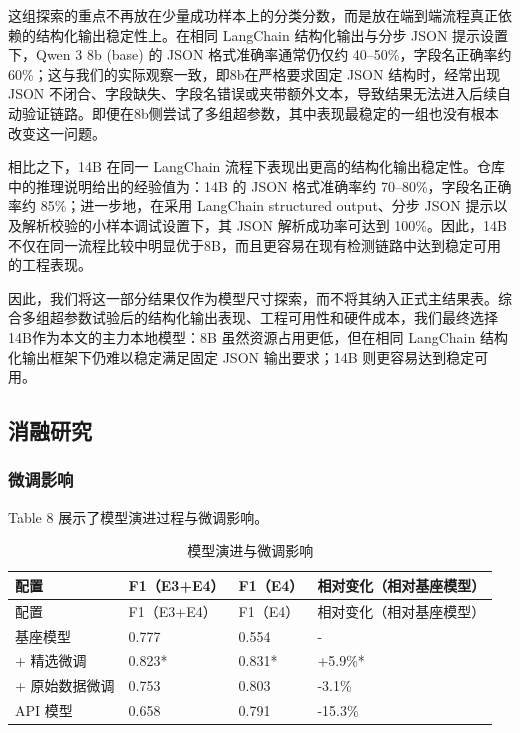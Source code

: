 \documentclass[11pt]{article}
\begin{document}
这组探索的重点不再放在少量成功样本上的分类分数，而是放在端到端流程真正依赖的结构化输出稳定性上。在相同 LangChain 结构化输出与分步 JSON 提示设置下，Qwen 3 8b (base) 的 JSON 格式准确率通常仍仅约 40--50\%，字段名正确率约 60\%；这与我们的实际观察一致，即8b在严格要求固定 JSON 结构时，经常出现 JSON 不闭合、字段缺失、字段名错误或夹带额外文本，导致结果无法进入后续自动验证链路。即便在8b侧尝试了多组超参数，其中表现最稳定的一组也没有根本改变这一问题。

相比之下，14B 在同一 LangChain 流程下表现出更高的结构化输出稳定性。仓库中的推理说明给出的经验值为：14B 的 JSON 格式准确率约 70--80\%，字段名正确率约 85\%；进一步地，在采用 LangChain structured output、分步 JSON 提示以及解析校验的小样本调试设置下，其 JSON 解析成功率可达到 100\%。因此，14B 不仅在同一流程比较中明显优于8B，而且更容易在现有检测链路中达到稳定可用的工程表现。

因此，我们将这一部分结果仅作为模型尺寸探索，而不将其纳入正式主结果表。综合多组超参数试验后的结构化输出表现、工程可用性和硬件成本，我们最终选择14B作为本文的主力本地模型：8B 虽然资源占用更低，但在相同 LangChain 结构化输出框架下仍难以稳定满足固定 JSON 输出要求；14B 则更容易达到稳定可用。

\subsection{消融研究}

\subsubsection{微调影响}

Table 8 展示了模型演进过程与微调影响。

\begin{longtable}[]{@{}llll@{}}
\caption{模型演进与微调影响}\tabularnewline
\toprule\noalign{}
配置 & F1（E3+E4） & F1（E4） & 相对变化（相对基座模型） \\
\midrule\noalign{}
\endfirsthead
\toprule\noalign{}
配置 & F1（E3+E4） & F1（E4） & 相对变化（相对基座模型） \\
\midrule\noalign{}
\endhead
\bottomrule\noalign{}
\endlastfoot
基座模型 & 0.777 & 0.554 & - \\
+ 精选微调 & 0.823* & 0.831* & +5.9\%* \\
+ 原始数据微调 & 0.753 & 0.803 & -3.1\% \\
API 模型 & 0.658 & 0.791 & -15.3\% \\
\end{longtable}
\end{document}
